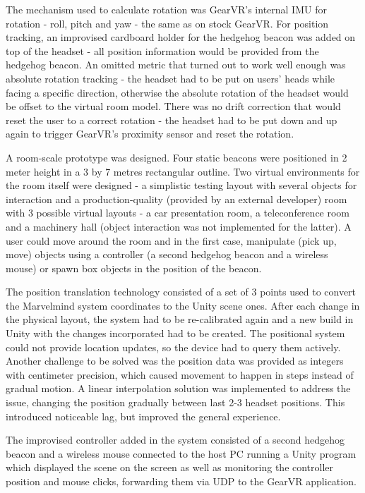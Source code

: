 \documentclass[12pt, a4paper]{article}
\begin{document}
The mechanism used to calculate rotation was GearVR’s internal IMU for rotation - roll, pitch and yaw - the same as on stock GearVR. For position tracking, an improvised cardboard holder for the hedgehog beacon was added on top of the headset - all position information would be provided from the hedgehog beacon. An omitted metric that turned out to work well enough was absolute rotation tracking - the headset had to be put on users’ heads while facing a specific direction, otherwise the absolute rotation of the headset would be offset to the virtual room model. There was no drift correction that would reset the user to a correct rotation - the headset had to be put down and up again to trigger GearVR’s proximity sensor and reset the rotation.

A room-scale prototype was designed. Four static beacons were positioned in 2 meter height in a 3 by 7 metres rectangular outline. Two virtual environments for the room itself were designed - a simplistic testing layout with several objects for interaction and a production-quality (provided by an external developer) room with 3 possible virtual layouts - a car presentation room, a teleconference room and a machinery hall (object interaction was not implemented for the latter). A user could move around the room and in the first case, manipulate (pick up, move) objects using a controller (a second hedgehog beacon and a wireless mouse) or spawn box objects in the position of the beacon.

The position translation technology consisted of a set of 3 points used to convert the Marvelmind system coordinates to the Unity scene ones. After each change in the physical layout, the system had to be re-calibrated again and a new build in Unity with the changes incorporated had to be created. The positional system could not provide location updates, so the device had to query them actively. Another challenge to be solved was the position data was provided as integers with centimeter precision, which caused movement to happen in steps instead of gradual motion. A linear interpolation solution was implemented to address the issue, changing the position gradually between last 2-3 headset positions. This introduced noticeable lag, but improved the general experience.

The improvised controller added in the system consisted of a second hedgehog beacon and a wireless mouse connected to the host PC running a Unity program which displayed the scene on the screen as well as monitoring the controller position and mouse clicks, forwarding them via UDP to the GearVR application.
\end{document}
